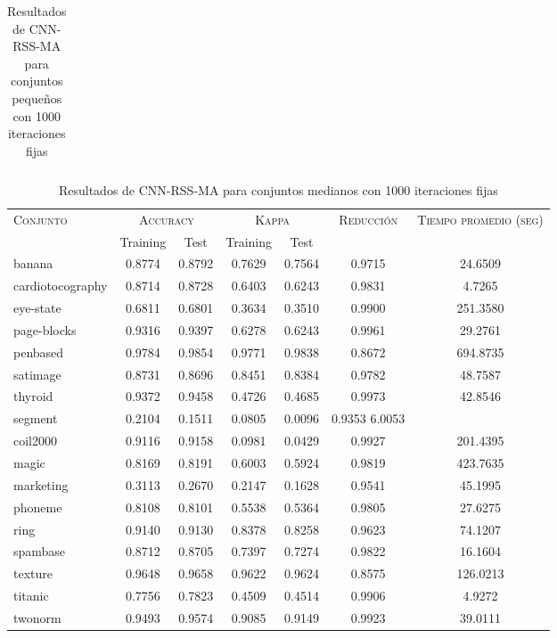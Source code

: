 \begin{table}[]
\begin{tabular}{l c c c c c c}
\hline
\end{tabular}
\caption{Resultados de CNN-RSS-MA para conjuntos pequeños con 1000 iteraciones fijas}
\label{res-peq-CNN-RSS-MA}
\end{table}


\begin{table}[]
\centering
\begin{tabular}{l c c c c c c}
\hline
\multirow{2}{*}{\textsc{Conjunto}}
	& \multicolumn{2}{c}{\textsc{Accuracy}}
	& \multicolumn{2}{c}{\textsc{Kappa}}
	& \textsc{Reducción}
	& \textsc{Tiempo promedio (seg)} \\
	& Training & Test
	& Training & Test \\ 
\hline
\hline

banana & 0.8774 & 0.8792 & 0.7629 & 0.7564 & 0.9715 & 24.6509 \\
cardiotocography & 0.8714 & 0.8728 & 0.6403 & 0.6243 & 0.9831 & 4.7265 \\
eye-state & 0.6811 & 0.6801 & 0.3634 & 0.3510 & 0.9900 &  251.3580 \\
page-blocks & 0.9316 & 0.9397 & 0.6278 & 0.6243 & 0.9961 & 29.2761 \\
penbased & 0.9784 & 0.9854 & 0.9771 & 0.9838 & 0.8672 &  694.8735 \\
satimage & 0.8731 & 0.8696 & 0.8451 & 0.8384 & 0.9782 & 48.7587 \\
thyroid & 0.9372 & 0.9458 & 0.4726 & 0.4685 & 0.9973 & 42.8546 \\
segment & 0.2104 & 0.1511 & 0.0805 & 0.0096 & 0.9353  6.0053 \\
coil2000 & 0.9116 & 0.9158 & 0.0981 & 0.0429 & 0.9927 &  201.4395 \\
magic & 0.8169 & 0.8191 & 0.6003 & 0.5924 & 0.9819 &  423.7635 \\
marketing & 0.3113 & 0.2670 & 0.2147 & 0.1628 & 0.9541 & 45.1995 \\
phoneme & 0.8108 & 0.8101 & 0.5538 & 0.5364 & 0.9805 & 27.6275 \\
ring & 0.9140 & 0.9130 & 0.8378 & 0.8258 & 0.9623 & 74.1207 \\
spambase & 0.8712 & 0.8705 & 0.7397 & 0.7274 & 0.9822 & 16.1604 \\
texture & 0.9648 & 0.9658 & 0.9622 & 0.9624 & 0.8575 & 126.0213 \\
titanic & 0.7756 & 0.7823 & 0.4509 & 0.4514 & 0.9906 & 4.9272 \\
twonorm & 0.9493 & 0.9574 & 0.9085 & 0.9149 & 0.9923 & 39.0111 \\

\hline
\end{tabular}
\caption{Resultados de CNN-RSS-MA para conjuntos medianos con 1000 iteraciones fijas}
\label{res-med-CNN-RSS-MA}
\end{table}

